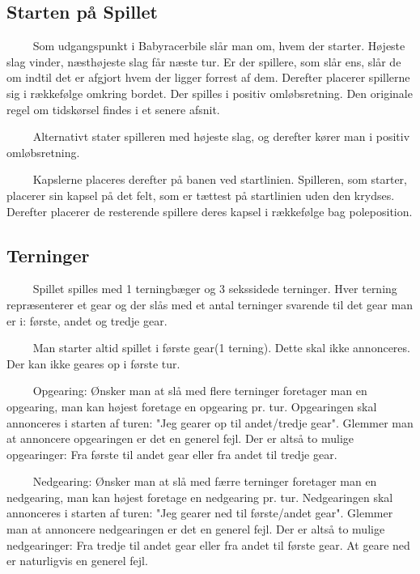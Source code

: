 \documentclass[12pt]{article}
\begin{document}
\subsection*{Starten på Spillet}

$\qquad$ Som udgangspunkt i Babyracerbile slår man om, hvem der starter. Højeste slag vinder, næsthøjeste slag får næste tur. Er der spillere, som slår ens, slår de om indtil det er afgjort hvem der ligger forrest af dem. Derefter placerer spillerne sig i rækkefølge omkring bordet. Der spilles i positiv omløbsretning. Den originale regel om tidskørsel findes i et senere afsnit.

$\qquad$ Alternativt stater spilleren med højeste slag, og derefter kører man i positiv omløbsretning.

$\qquad$ Kapslerne placeres derefter på banen ved startlinien. Spilleren, som starter, placerer sin kapsel på det felt, som er tættest på startlinien uden den krydses. Derefter placerer de resterende spillere deres kapsel i rækkefølge bag poleposition.


\subsection*{Terninger}

$\qquad$ Spillet spilles med 1 terningbæger og 3 sekssidede terninger. Hver terning repræsenterer et gear og der slås med et antal terninger svarende til det gear man er i: første, andet og tredje gear.

$\qquad$ Man starter altid spillet i første gear(1 terning). Dette skal ikke annonceres. Der kan ikke geares op i første tur.

$\qquad$ Opgearing: Ønsker man at slå med flere terninger foretager man en opgearing, man kan højest foretage en opgearing pr. tur. Opgearingen skal annonceres i starten af turen: "Jeg gearer op til andet/tredje gear". Glemmer man at annoncere opgearingen er det en generel fejl. Der er altså to mulige opgearinger: Fra første til andet gear eller fra andet til tredje gear.

$\qquad$ Nedgearing: Ønsker man at slå med færre terninger foretager man en nedgearing, man kan højest foretage en nedgearing pr. tur. Nedgearingen skal annonceres i starten af turen: "Jeg gearer ned til første/andet gear". Glemmer man at annoncere nedgearingen er det en generel fejl. Der er altså to mulige nedgearinger: Fra tredje til andet gear eller fra andet til første gear. At geare ned er naturligvis en generel fejl.
\end{document}
